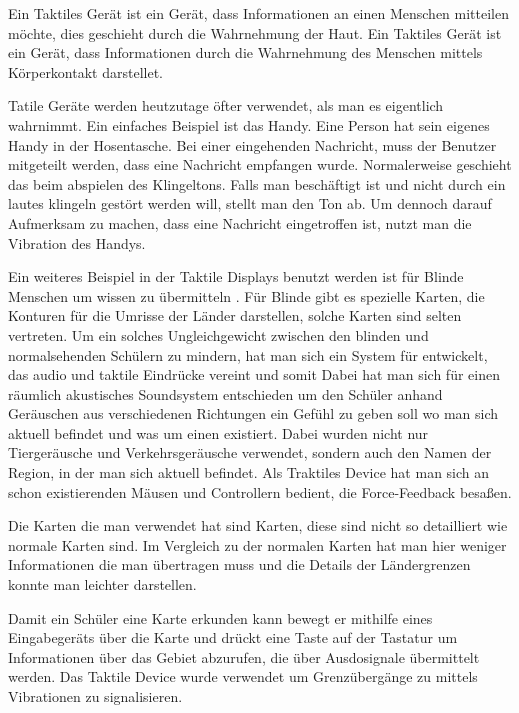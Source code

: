 
Ein Taktiles Ger{\"a}t ist ein Ger{\"a}t, dass Informationen an einen Menschen mitteilen m{\"o}chte, dies geschieht durch die Wahrnehmung der Haut. 
Ein Taktiles Ger{\"a}t ist ein Ger{\"a}t, dass Informationen durch die Wahrnehmung des Menschen mittels K{\"o}rperkontakt darstellet.  \cite{gemperle2001design}

Tatile Ger{\"a}te werden heutzutage {\"o}fter verwendet, als man es eigentlich wahrnimmt. 
Ein einfaches Beispiel ist das Handy. 
Eine Person hat sein eigenes Handy in der Hosentasche. Bei einer eingehenden Nachricht, muss der Benutzer mitgeteilt werden, dass eine Nachricht empfangen wurde.
Normalerweise geschieht das beim abspielen des Klingeltons. Falls man besch{\"a}ftigt ist und nicht durch ein lautes klingeln gest{\"o}rt werden will,  stellt man den Ton ab. 
Um dennoch darauf Aufmerksam zu machen, dass eine Nachricht eingetroffen ist, nutzt man die Vibration des Handys.

Ein weiteres Beispiel in der Taktile Displays benutzt werden ist f{\"u}r Blinde Menschen um wissen zu {\"u}bermitteln \cite{parente2003bats}. 
F{\"u}r Blinde gibt es spezielle Karten, die Konturen f{\"u}r die Umrisse der L{\"a}nder darstellen, solche Karten sind selten vertreten.
Um ein solches Ungleichgewicht zwischen den blinden und normalsehenden Sch{\"u}lern zu mindern, hat man sich ein System f{\"u}r entwickelt, das audio und taktile Eindr{\"u}cke vereint und somit 
Dabei hat man sich f{\"u}r einen r{\"a}umlich akustisches Soundsystem entschieden um den Sch{\"u}ler anhand Ger{\"a}uschen aus verschiedenen Richtungen ein Gef{\"u}hl zu geben soll wo man sich aktuell befindet und was um einen existiert. Dabei wurden nicht nur Tierger{\"a}usche und Verkehrsger{\"a}usche verwendet, sondern auch den Namen der Region, in der man sich aktuell befindet. 
Als Traktiles Device hat man sich an schon existierenden M{\"a}usen und Controllern bedient, die Force-Feedback besa{\ss}en. 

Die Karten die man verwendet hat sind Karten, diese sind nicht so detailliert wie normale Karten sind. Im Vergleich zu der normalen Karten hat man hier weniger Informationen die man {\"u}bertragen muss und die Details der L{\"a}ndergrenzen konnte man leichter darstellen. 

Damit ein Sch{\"u}ler eine Karte erkunden kann bewegt er mithilfe eines Eingabeger{\"a}ts {\"u}ber die Karte und dr{\"u}ckt eine Taste auf der Tastatur um Informationen {\"u}ber das Gebiet abzurufen, die {\"u}ber Ausdosignale {\"u}bermittelt werden. Das Taktile Device wurde verwendet um Grenz{\"u}berg{\"a}nge zu mittels Vibrationen zu signalisieren.


